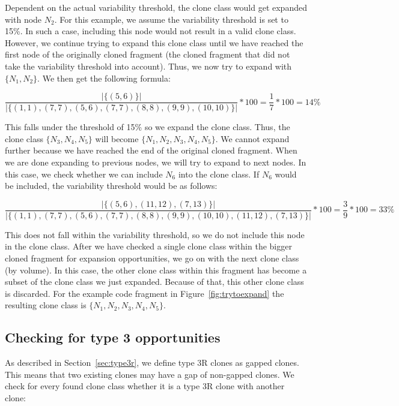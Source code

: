 Dependent on the actual variability threshold, the clone class would get expanded with node $N_2$. For this example, we assume the variability threshold is set to 15\%. In such a case, including this node would not result in a valid clone class. However, we continue trying to expand this clone class until we have reached the first node of the originally cloned fragment (the cloned fragment that did not take the variability threshold into account). Thus, we now try to expand with $\{N_1, N_2\}$. We then get the following formula:

\begin{equation}\label{eq:variabilitycombined2}
\frac{|\{(5,6)\}|}{|\{(1,1),(7,7),(5,6),(7,7),(8,8),(9,9),(10,10)\}|}*100 = \frac{1}{7}*100 = 14\%
\end{equation}

This falls under the threshold of 15\% so we expand the clone class. Thus, the clone class $\{N_3, N_4, N_5\}$ will become $\{N_1, N_2, N_3, N_4, N_5\}$. We cannot expand further because we have reached the end of the original cloned fragment. When we are done expanding to previous nodes, we will try to expand to next nodes. In this case, we check whether we can include $N_6$ into the clone class. If $N_6$ would be included, the variability threshold would be as follows:

\begin{equation}\label{eq:variabilitycombined3}
\frac{|\{(5,6),(11,12),(7,13)\}|}{|\{(1,1),(7,7),(5,6),(7,7),(8,8),(9,9),(10,10),(11,12),(7,13)\}|}*100 = \frac{3}{9}*100 = 33\%
\end{equation}

This does not fall within the variability threshold, so we do not include this node in the clone class. After we have checked a single clone class within the bigger cloned fragment for expansion opportunities, we go on with the next clone class (by volume). In this case, the other clone class within this fragment has become a subset of the clone class we just expanded. Because of that, this other clone class is discarded. For the example code fragment in Figure~\ref{fig:trytoexpand} the resulting clone class is $\{N_1, N_2, N_3, N_4, N_5\}$.

\subsection{Checking for type 3 opportunities} \label{sec:t3rclonerefactor}
As described in Section~\ref{sec:type3r}, we define type 3R clones as gapped clones. This means that two existing clones may have a gap of non-gapped clones. We check for every found clone class whether it is a type 3R clone with another clone:

